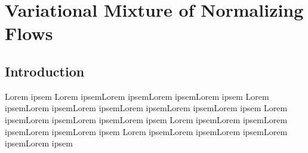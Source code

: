 \chapter{Variational Mixture of Normalizing Flows}
\label{chapter:vmonf}

\section{Introduction}

Lorem ipsem Lorem ipsemLorem ipsemLorem ipsemLorem ipsem
Lorem ipsemLorem ipsemLorem ipsemLorem ipsemLorem ipsemLorem ipsem
Lorem ipsemLorem ipsemLorem ipsemLorem ipsem
Lorem ipsemLorem ipsemLorem ipsemLorem ipsemLorem ipsem
Lorem ipsemLorem ipsemLorem ipsemLorem ipsemLorem ipsem
